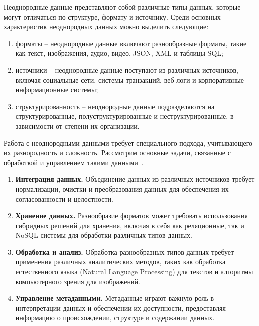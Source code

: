 Неоднородные данные представляют собой различные типы данных, которые могут отличаться по структуре, формату и источнику. 
Среди основных характеристик неоднородных данных можно выделить следующие:

\begin{enumerate}[wide=12.5mm, leftmargin=12.5mm]
	\item форматы -- неоднородные данные включают разнообразные форматы, такие как текст, изображения, аудио, видео, JSON, XML и таблицы SQL;
	\item источники -- неоднородные данные поступают из различных источников, включая социальные сети, системы транзакций, веб-логи и корпоративные информационные системы;
	\item структурированность -- неоднородные данные подразделяются на структурированные, полуструктурированные и неструктурированные, в зависимости от степени их организации.
\end{enumerate}

Работа с неоднородными данными требует специального подхода, учитывающего их разнородность и сложность.
Рассмотрим основные задачи, связанные с обработкой и управлением такими данными~\cite{big_data}.

\begin{enumerate}[wide=12.5mm, leftmargin=12.5mm]
 \item \textbf{Интеграция данных.} Объединение данных из различных источников требует нормализации, очистки и преобразования данных для обеспечения их согласованности и целостности.

 \item \textbf{Хранение данных.} Разнообразие форматов может требовать использования гибридных решений для хранения, включая в себя как реляционные, так и NoSQL системы для обработки различных типов данных.

 \item \textbf{Обработка и анализ.} Обработка разнообразных типов данных требует применения различных аналитических методов, таких как обработка естественного языка (Natural Language Processing) для текстов и алгоритмы компьютерного зрения для изображений.

 \item \textbf{Управление метаданными.} Метаданные играют важную роль в интерпретации данных и обеспечении их доступности, предоставляя информацию о происхождении, структуре и содержании данных.

\end{enumerate}

